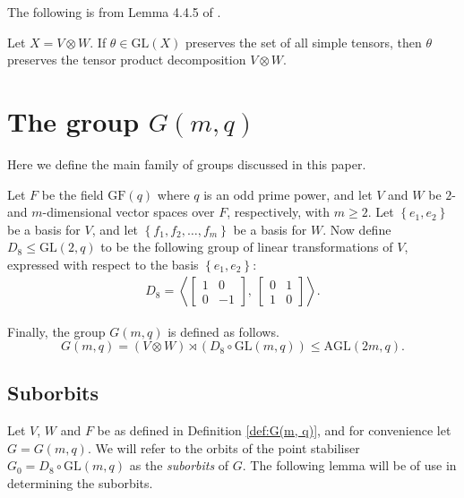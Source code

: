\documentclass[ALCO, Unicode]{cedram}
\newcommand{\AGL}{\mathrm{AGL}}
\newcommand{\GF}{\mathrm{GF}}
\newcommand{\GL}{\mathrm{GL}}
\begin{document}
The following is from Lemma 4.4.5 of \cite{ref:xu-aschbacher}.

\begin{lemma} \label{lm:preserves-simple-tensors-preserves-decomp}
Let $X = V \otimes W$. If $\theta \in \GL{\left(X \right)}$ preserves the set of all simple tensors, then $\theta$ preserves the tensor product decomposition $V \otimes W$.
\end{lemma}

\section{The group \texorpdfstring{$G{\left(m, q \right)}$}{G(m,q)}}

Here we define the main family of groups discussed in this paper.

\begin{defi} \label{def:G(m, q)}
Let $F$ be the field $\GF{\left(q \right)}$ where $q$ is an odd prime power, and let $V$ and $W$ be $2$- and $m$-dimensional vector spaces over $F$, respectively, with $m \geqslant 2$. Let $\left\{e_1, e_2 \right\}$ be a basis for $V$, and let $\left\{f_1, f_2, \ldots, f_m \right\}$ be a basis for $W$. Now define $D_8 \leqslant \GL{\left(2, q \right)}$ to be the following group of linear transformations of $V$, expressed with respect to the basis $\left\{e_1, e_2 \right\}$:
\begin{align}
D_8 = {\left<{\begin{bmatrix} 1 & 0 \\ 0 & -1 \end{bmatrix}},\ \begin{bmatrix} 0 & 1 \\ 1 & 0 \end{bmatrix} \right>}. \label{eqn:D_8}
\end{align}

Finally, the group $G{\left(m, q \right)}$ is defined as follows.
\begin{displaymath}
G{\left(m, q \right)} = \left(V \otimes W \right) \rtimes \left(D_8 \circ \GL{\left(m, q \right)}\right) \leqslant \AGL{\left(2m, q \right)}.
\end{displaymath}
\end{defi}

\subsection{Suborbits} \label{sc:suborbits}

Let $V$, $W$ and $F$ be as defined in Definition \ref{def:G(m, q)}, and for convenience let $G = G {\left(m, q \right)}$. We will refer to the orbits of the point stabiliser $G_0 = D_8 \circ \GL{\left(m, q \right)}$ as the \emph{suborbits} of $G$. The following lemma will be of use in determining the suborbits.
\end{document}
